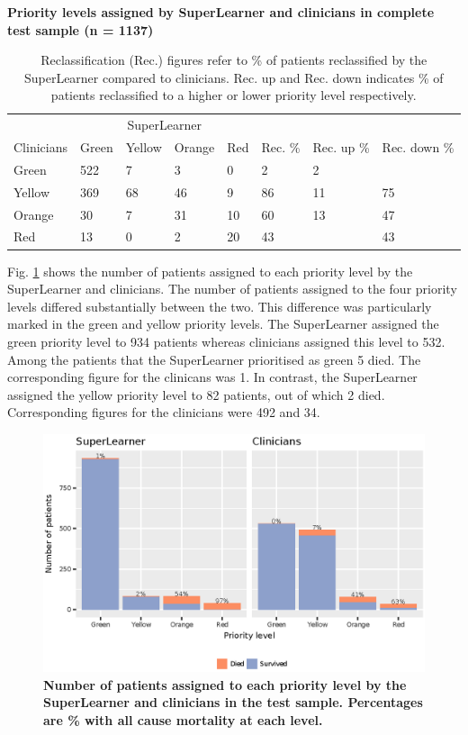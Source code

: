 \documentclass[10pt,letterpaper]{article}\usepackage[]{graphicx}\usepackage[]{color}
\begin{document}
\begin{table}[!ht]
\centering
\caption{\bf Priority levels assigned by SuperLearner and clinicians in complete test sample (n = 1137)} 
\label{tab:reclass_all}
\begin{tabular}{llllllll}
  \hline
  & \multicolumn{4}{c}{SuperLearner} \\
 Clinicians & Green & Yellow & Orange & Red & Rec. \% & Rec. up \% & Rec. down \% \\
 \hline
Green & 522 & 7 & 3 & 0 & 2 & 2 &  \\ 
  Yellow & 369 & 68 & 46 & 9 & 86 & 11 & 75 \\ 
  Orange & 30 & 7 & 31 & 10 & 60 & 13 & 47 \\ 
  Red & 13 & 0 & 2 & 20 & 43 &  & 43 \\ 
   \hline
\end{tabular}
\caption*{Reclassification (Rec.) figures refer to \% of patients reclassified by the SuperLearner compared to clinicians. Rec. up and Rec. down indicates \% of patients reclassified to a higher or lower priority level respectively.} 
\end{table}


Fig. \ref{fig:mortality_plot} shows the number of patients assigned to each
priority level by the SuperLearner and clinicians. The number of patients
assigned to the four priority levels differed substantially between the
two. This difference was particularly marked in the green and yellow priority
levels. The SuperLearner assigned the green priority level to
934 patients whereas clinicians assigned this
level to 532. Among the patients that the
SuperLearner prioritised as green 5 died. The
corresponding figure for the clinicans was
1. In contrast, the SuperLearner assigned the
yellow priority level to 82 patients, out of
which 2 died. Corresponding figures for the
clinicians were 492 and
34.

\begin{figure}[!h]
  \caption{\bf Number of patients assigned to each priority level by the SuperLearner and clinicians in the test sample. Percentages are \% with all cause mortality at each level.}
  \label{fig:mortality_plot} 
  \includegraphics{mortality_plot.eps}
\end{figure}
\end{document}
